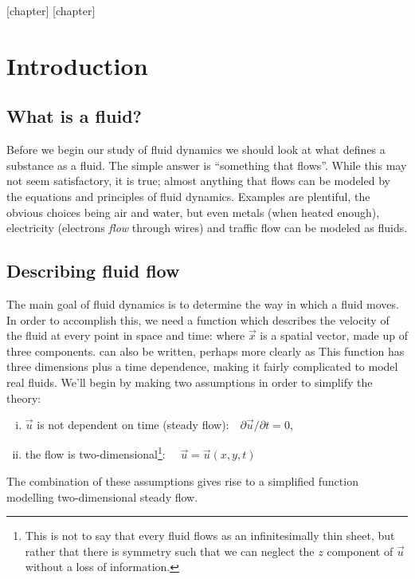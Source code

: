 \documentclass[12pt]{book}
\begin{document}
\clearpage \mbox{}
\thispagestyle{empty}

\newpage

[chapter]
[chapter]






\newpage
\tableofcontents
\newpage
\chapter{Introduction}
\section{What is a fluid?}
Before we begin our study of fluid dynamics we should look at what defines a substance as a fluid.  The simple answer is ``something that flows''.  While this may not seem satisfactory, it is true; almost anything that flows can be modeled by the equations and principles of fluid dynamics.  Examples are plentiful, the obvious choices being air and water, but even metals (when heated enough), electricity (electrons \textit{flow} through wires) and traffic flow can be modeled as fluids.


\section{Describing fluid flow}

The main goal of fluid dynamics is to determine the way in which a fluid moves.  In order to accomplish this, we need a function which describes the velocity of the fluid at every point in space and time:
where $\vec x$ is a spatial vector, made up of three components.  can also be written, perhaps more clearly as 
This function has three dimensions plus a time dependence, making it fairly complicated to model real fluids.  We'll begin by making two assumptions in order to simplify the theory:
\begin{enumerate}[i. ]
\item{$\vec u$ is not dependent on time (steady flow):\ \  $\partial \vec u / \partial t = 0$,}
\item{the flow is two-dimensional\footnote{This is not to say that every fluid flows as an infinitesimally thin sheet, but rather that there is symmetry such that we can neglect the $z$ component of $\vec u$ without a loss of information.}: \ \ $\vec u = \vec u (x,y,t)$}
\end{enumerate}
The combination of these assumptions gives rise to a simplified function 
 modelling two-dimensional steady flow.
\end{document}
